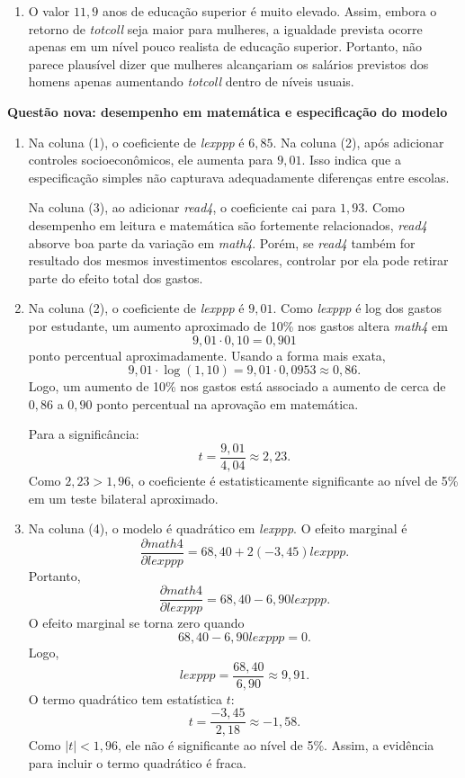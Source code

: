 \documentclass[12pt,letterpaper,onecolumn]{exam}
\begin{document}
\begin{questions}
\begin{enumerate}[label=(\roman*)]
    \item O valor \(11{,}9\) anos de educação superior é muito elevado. Assim, embora o retorno de \textit{totcoll} seja maior para mulheres, a igualdade prevista ocorre apenas em um nível pouco realista de educação superior. Portanto, não parece plausível dizer que mulheres alcançariam os salários previstos dos homens apenas aumentando \textit{totcoll} dentro de níveis usuais.
\end{enumerate}

\vspace{0.8cm}

\question \textbf{Questão nova: desempenho em matemática e especificação do modelo}

\begin{enumerate}[label=(\alph*)]
    \item Na coluna (1), o coeficiente de \textit{lexppp} é \(6{,}85\). Na coluna (2), após adicionar controles socioeconômicos, ele aumenta para \(9{,}01\). Isso indica que a especificação simples não capturava adequadamente diferenças entre escolas.

    Na coluna (3), ao adicionar \textit{read4}, o coeficiente cai para \(1{,}93\). Como desempenho em leitura e matemática são fortemente relacionados, \textit{read4} absorve boa parte da variação em \textit{math4}. Porém, se \textit{read4} também for resultado dos mesmos investimentos escolares, controlar por ela pode retirar parte do efeito total dos gastos.

    \item Na coluna (2), o coeficiente de \textit{lexppp} é \(9{,}01\). Como \textit{lexppp} é log dos gastos por estudante, um aumento aproximado de 10\% nos gastos altera \textit{math4} em
    \[
    9{,}01\cdot 0{,}10=0{,}901
    \]
    ponto percentual aproximadamente. Usando a forma mais exata,
    \[
    9{,}01\cdot \log(1{,}10)
    =
    9{,}01\cdot 0{,}0953
    \approx 0{,}86.
    \]
    Logo, um aumento de 10\% nos gastos está associado a aumento de cerca de \(0{,}86\) a \(0{,}90\) ponto percentual na aprovação em matemática.

    Para a significância:
    \[
    t=\frac{9{,}01}{4{,}04}\approx 2{,}23.
    \]
    Como \(2{,}23>1{,}96\), o coeficiente é estatisticamente significante ao nível de 5\% em um teste bilateral aproximado.

    \item Na coluna (4), o modelo é quadrático em \textit{lexppp}. O efeito marginal é
    \[
    \frac{\partial math4}{\partial lexppp}
    =
    68{,}40+2(-3{,}45)lexppp.
    \]
    Portanto,
    \[
    \frac{\partial math4}{\partial lexppp}
    =
    68{,}40-6{,}90lexppp.
    \]
    O efeito marginal se torna zero quando
    \[
    68{,}40-6{,}90lexppp=0.
    \]
    Logo,
    \[
    lexppp=\frac{68{,}40}{6{,}90}\approx 9{,}91.
    \]
    O termo quadrático tem estatística \(t\):
    \[
    t=\frac{-3{,}45}{2{,}18}\approx -1{,}58.
    \]
    Como \(|t|<1{,}96\), ele não é significante ao nível de 5\%. Assim, a evidência para incluir o termo quadrático é fraca.


\end{enumerate}
\end{questions}
\end{document}
